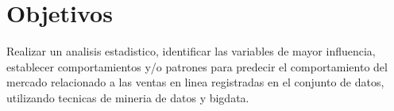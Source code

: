 \section{Objetivos}
 Realizar un analisis estadistico, identificar las variables de mayor influencia, establecer comportamientos y/o patrones para predecir el comportamiento del mercado relacionado a las ventas en linea registradas en el conjunto de datos, utilizando tecnicas de mineria de datos y bigdata.